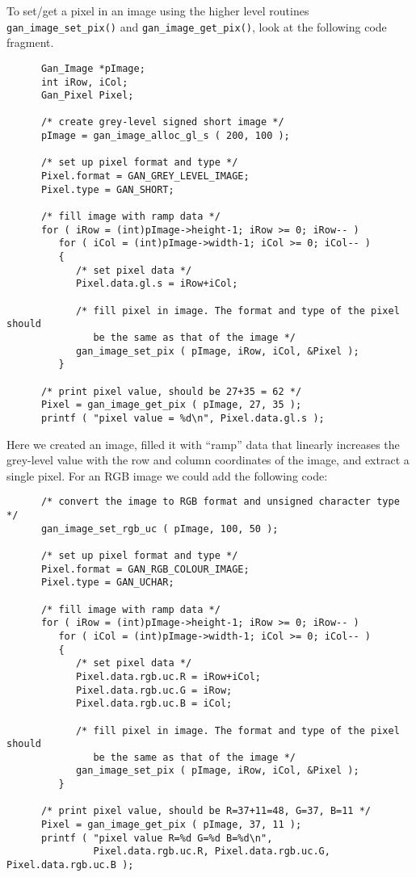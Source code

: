 To set/get a pixel in an image using the higher level routines
{\tt gan\_image\_set\_pix()} and {\tt gan\_image\_get\_pix()},
look at the following code fragment.
\begin{verbatim}
      Gan_Image *pImage;
      int iRow, iCol;
      Gan_Pixel Pixel;

      /* create grey-level signed short image */
      pImage = gan_image_alloc_gl_s ( 200, 100 );

      /* set up pixel format and type */
      Pixel.format = GAN_GREY_LEVEL_IMAGE;
      Pixel.type = GAN_SHORT;

      /* fill image with ramp data */
      for ( iRow = (int)pImage->height-1; iRow >= 0; iRow-- )
         for ( iCol = (int)pImage->width-1; iCol >= 0; iCol-- )
         {
            /* set pixel data */
            Pixel.data.gl.s = iRow+iCol;

            /* fill pixel in image. The format and type of the pixel should
               be the same as that of the image */
            gan_image_set_pix ( pImage, iRow, iCol, &Pixel );
         }

      /* print pixel value, should be 27+35 = 62 */
      Pixel = gan_image_get_pix ( pImage, 27, 35 );
      printf ( "pixel value = %d\n", Pixel.data.gl.s );
\end{verbatim}
Here we created an image, filled it with ``ramp'' data that linearly
increases the grey-level value with the row and column coordinates of the
image, and extract a single pixel. For an RGB image we could add the
following code:
\begin{verbatim}
      /* convert the image to RGB format and unsigned character type */
      gan_image_set_rgb_uc ( pImage, 100, 50 );

      /* set up pixel format and type */
      Pixel.format = GAN_RGB_COLOUR_IMAGE;
      Pixel.type = GAN_UCHAR;

      /* fill image with ramp data */
      for ( iRow = (int)pImage->height-1; iRow >= 0; iRow-- )
         for ( iCol = (int)pImage->width-1; iCol >= 0; iCol-- )
         {
            /* set pixel data */
            Pixel.data.rgb.uc.R = iRow+iCol;
            Pixel.data.rgb.uc.G = iRow;
            Pixel.data.rgb.uc.B = iCol;

            /* fill pixel in image. The format and type of the pixel should
               be the same as that of the image */
            gan_image_set_pix ( pImage, iRow, iCol, &Pixel );
         }

      /* print pixel value, should be R=37+11=48, G=37, B=11 */
      Pixel = gan_image_get_pix ( pImage, 37, 11 );
      printf ( "pixel value R=%d G=%d B=%d\n",
               Pixel.data.rgb.uc.R, Pixel.data.rgb.uc.G, Pixel.data.rgb.uc.B );
\end{verbatim}

